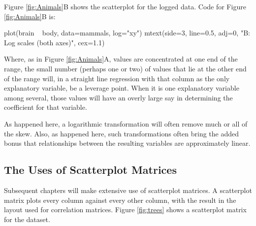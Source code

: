Figure \ref{fig:Animals}B shows the scatterplot for the logged data.
Code for Figure \ref{fig:Animals}B is:
\begin{Schunk}
\begin{Sinput}
plot(brain ~ body, data=mammals, log="xy")
mtext(side=3, line=0.5, adj=0,
      "B: Log scales (both axes)", cex=1.1)
\end{Sinput}
\end{Schunk}

Where, as in Figure \ref{fig:Animals}A, values are concentrated at one
end of the range, the small number (perhaps one or two) of values that
lie at the other end of the range will, in a straight line regression
with that column as the only explanatory variable, be a leverage
point.  When it is one explanatory variable among several, those
values will have an overly large say in determining the coefficient
for that variable.

As happened here, a logarithmic transformation will often remove much
or all of the skew.  Also, as happened here, such transformations often
bring the added bonus that relationships between the resulting
variables are approximately linear.

\subsection{The Uses of Scatterplot Matrices}\label{sec:spm}

Subsequent chapters will make extensive use of scatterplot matrices.
A scatterplot matrix plots every column against every other column,
with the result in the layout used for correlation matrices.  Figure
\ref{fig:trees} shows a scatterplot matrix for the
 dataset.  

